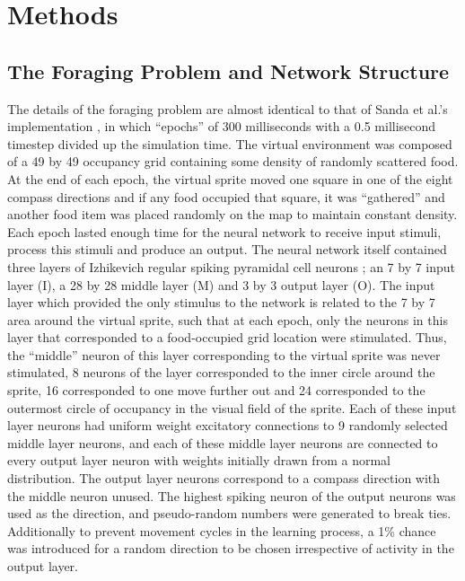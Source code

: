 \documentclass[11pt, twocolumn]{article}
\begin{document}
\section*{Methods}
\subsection*{The Foraging Problem and Network Structure}
The details of the foraging problem are almost identical to that of Sanda et al.'s implementation \cite{sanda2017multi}, in which ``epochs'' of 300 milliseconds with a 0.5 millisecond timestep divided up the simulation time. The virtual environment was composed of a 49 by 49 occupancy grid containing some density of randomly scattered food. At the end of each epoch, the virtual sprite moved one square in one of the eight compass directions and if any food occupied that square, it was ``gathered'' and another food item was placed randomly on the map to maintain constant density. Each epoch lasted enough time for the neural network to receive input stimuli, process this stimuli and produce an output. The neural network itself contained three layers of Izhikevich regular spiking pyramidal cell neurons \cite{izhikevich2007dynamical}\cite{izhikevich2008large}; an 7 by 7 input layer (I), a 28 by 28 middle layer (M) and 3 by 3 output layer (O). The input layer which provided the only stimulus to the network is related to the 7 by 7 area around the virtual sprite, such that at each epoch, only the neurons in this layer that corresponded to a food-occupied grid location were stimulated. Thus, the ``middle'' neuron of this layer corresponding to the virtual sprite was never stimulated, 8 neurons of the layer corresponded to the inner circle around the sprite, 16 corresponded to one move further out and 24 corresponded to the outermost circle of occupancy in the visual field of the sprite. Each of these input layer neurons had uniform weight excitatory connections to 9 randomly selected middle layer neurons, and each of these middle layer neurons are connected to every output layer neuron with weights initially drawn from a normal distribution. The output layer neurons correspond to a compass direction with the middle neuron unused. The highest spiking neuron of the output neurons was used as the direction, and pseudo-random numbers were generated to break ties. Additionally to prevent movement cycles in the learning process, a 1\% chance was introduced for a random direction to be chosen irrespective of activity in the output layer.
\end{document}
